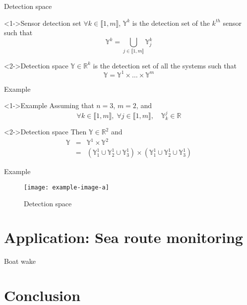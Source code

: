 \documentclass{beamer}
\begin{document}
        \begin{frame}{Detection space}
            \begin{block}<1->{Sensor detection set}
                $\forall k \in \llbracket 1, m\rrbracket$, $\mathbb{Y}^k$ is the detection set of the $k^{th}$ sensor such that
                \begin{equation}
                    \mathbb{Y}^k = \bigcup_{j \in \llbracket 1, m\rrbracket} \mathbb{Y}_j^k
                \end{equation}
            \end{block}
            \begin{block}<2->{Detection space}
                $\mathbb{Y} \in \mathbb{R}^k$ is the detection set of all the systems such that
                \begin{equation}
                    \mathbb{Y} = \mathbb{Y}^1 \times \dots \times \mathbb{Y}^m
                \end{equation}
            \end{block}
        \end{frame}

        \begin{frame}{Example}
            \begin{exampleblock}<1->{Example}
                Assuming that $n = 3$, $m = 2$, and
                $$\forall k \in \llbracket 1, m\rrbracket, \;  \forall j \in \llbracket 1, m\rrbracket, \quad \mathbb{Y}_k^j \in \mathbb{R}$$
            \end{exampleblock}
            \begin{exampleblock}<2->{Detection space}
                Then $\mathbb{Y} \in \mathbb{R}^2$ and
                \begin{eqnarray}
                    \mathbb{Y} & = & \mathbb{Y}^1 \times \mathbb{Y}^2 \\
                    & = & \left(\mathbb{Y}_1^1 \cup \mathbb{Y}_2^1 \cup \mathbb{Y}_3^1\right) \times \left(\mathbb{Y}_1^1 \cup \mathbb{Y}_2^1 \cup \mathbb{Y}_3^1\right)
                \end{eqnarray}
            \end{exampleblock}
        \end{frame}

        \begin{frame}{Example}
            \begin{figure}
                \texttt{[image: example-image-a]}
                \caption{Detection space}
            \end{figure}
        \end{frame}

    \section{Application: Sea route monitoring}

        \begin{frame}{Boat wake}
            
        \end{frame}

    \section{Conclusion}
\end{document}
